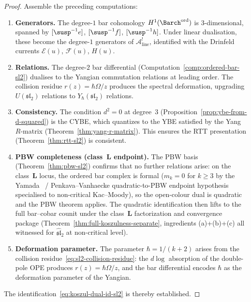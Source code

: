 \begin{proof}
Assemble the preceding computations:
\begin{enumerate}[label=(\roman*)]
\item \textbf{Generators.}
The degree-$1$ bar cohomology $H^1({\Barch}^{\mathrm{ord}})$ is
$3$-dimensional, spanned by $[\susp^{-1}e]$, $[\susp^{-1}f]$,
$[\susp^{-1}h]$. Under linear dualisation, these become
the degree-$1$ generators of $\mathcal A^!_{\mathrm{line}}$,
identified with the Drinfeld currents $\mathcal E(u)$, $\mathcal F(u)$, $H(u)$.

\item \textbf{Relations.}
The degree-$2$ bar differential
(Computation~\ref{comp:ordered-bar-sl2})
dualises to the Yangian commutation relations at leading order.
The collision residue $r(z)=\hbar\Omega/z$ produces the spectral
deformation, upgrading $U(\mathfrak{sl}_2)$ relations to
$Y_\hbar(\mathfrak{sl}_2)$ relations.

\item \textbf{Consistency.}
The condition $d^2=0$ at degree~$3$
(Proposition~\ref{prop:ybe-from-d-squared}) is the CYBE, which
quantizes to the YBE satisfied by the Yang $R$-matrix
(Theorem~\ref{thm:yang-r-matrix}). This ensures the RTT presentation
(Theorem~\ref{thm:rtt-sl2}) is consistent.

\item \textbf{PBW completeness (class~$\mathbf L$ endpoint).}
The PBW basis (Theorem~\ref{thm:pbw-sl2}) confirms that no further
relations arise: on the class~$\mathbf L$ locus, the ordered bar
complex is formal ($m_k=0$ for $k\ge 3$ by the
Yamada~\cite{Yamada89} / Penkava--Vanhaecke quadratic-to-PBW endpoint
hypothesis specialised to non-critical Kac--Moody), so the
open-colour dual is quadratic and the PBW theorem applies. The
quadratic identification then lifts to the full bar--cobar counit
under the class~$\mathbf L$ factorization and convergence package
(Theorem~\ref{thm:full-koszulness-separate}, ingredients (a)+(b)+(c)
all witnessed for $\widehat{\mathfrak{sl}}_2$ at non-critical level).

\item \textbf{Deformation parameter.}
The parameter $\hbar=1/(k+2)$ arises from
the collision residue~\eqref{eq:sl2-collision-residue}: the $d\log$
absorption of the double-pole OPE produces $r(z)=\hbar\Omega/z$,
and the bar differential encodes $\hbar$ as the deformation parameter
of the Yangian.
\end{enumerate}
The identification~\eqref{eq:koszul-dual-id-sl2} is thereby established.
\end{proof}

